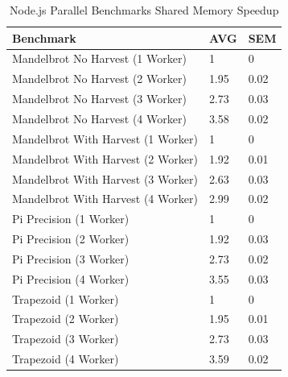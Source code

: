 \documentclass[oneside]{um-fict}
\begin{document}
\begin{table}[H]
    \begin{center}
        \begin{tabular}{|l|ll|}
        \hline
        Benchmark                  & AVG & SEM \\ \hline
        Mandelbrot No Harvest (1 Worker)   & 1       & 0              \\
        Mandelbrot No Harvest (2 Worker)   & 1.95    & 0.02           \\
        Mandelbrot No Harvest (3 Worker)   & 2.73    & 0.03           \\
        Mandelbrot No Harvest (4 Worker)   & 3.58    & 0.02           \\
        Mandelbrot With Harvest (1 Worker) & 1       & 0              \\
        Mandelbrot With Harvest (2 Worker) & 1.92    & 0.01           \\
        Mandelbrot With Harvest (3 Worker) & 2.63    & 0.03           \\
        Mandelbrot With Harvest (4 Worker) & 2.99    & 0.02           \\
        Pi Precision (1 Worker)            & 1       & 0              \\
        Pi Precision (2 Worker)            & 1.92    & 0.03           \\
        Pi Precision (3 Worker)            & 2.73    & 0.02           \\
        Pi Precision (4 Worker)            & 3.55    & 0.03           \\
        Trapezoid (1 Worker)               & 1       & 0              \\
        Trapezoid (2 Worker)               & 1.95    & 0.01           \\
        Trapezoid (3 Worker)               & 2.73    & 0.03           \\
        Trapezoid (4 Worker)               & 3.59    & 0.02           \\ \hline
        \end{tabular}
        \caption{Node.js Parallel Benchmarks Shared Memory Speedup}\label{tab:nodesharedmemoryspeedup}
    \end{center}
\end{table}
\end{document}
